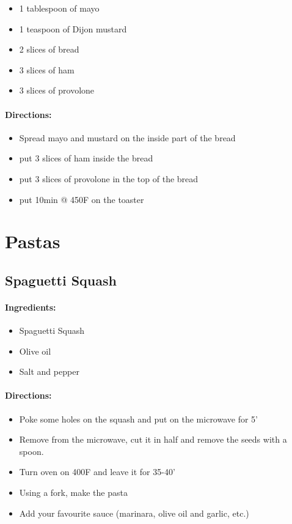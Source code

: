 \documentclass{article}
\begin{document}
\begin{itemize}
	\item 1 tablespoon of mayo 
	\item 1 teaspoon of Dijon mustard 
	\item 2 slices of bread 
	\item 3 slices of ham 
	\item 3 slices of provolone
\end{itemize}

\paragraph{Directions:}
\begin{itemize}
	\item Spread mayo and mustard on the inside part of the bread 
	\item put 3 slices of ham inside the bread 
	\item put 3 slices of provolone in the top of the bread 
	\item put 10min @ 450F on the toaster 
\end{itemize}

\section{Pastas}

\subsection{Spaguetti Squash}

\paragraph{Ingredients:}

\begin{itemize}
	\item Spaguetti Squash
	\item Olive oil
	\item Salt and pepper
	
\end{itemize}

\paragraph{Directions:}
\begin{itemize}
	\item Poke some holes on the squash and put on the microwave for 5'
	\item Remove from the microwave, cut it in half and remove the seeds with a spoon.
	\item Turn oven on 400F and leave it for 35-40'
	\item Using a fork, make the pasta
	\item Add your favourite sauce (marinara, olive oil and garlic, etc.)
\end{itemize}
\end{document}
